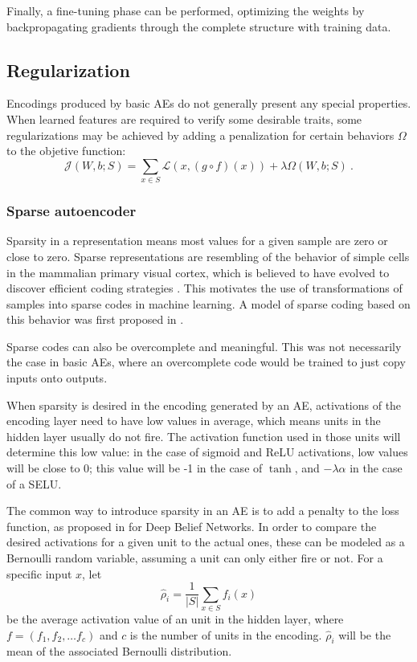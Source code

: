 Finally, a fine-tuning phase can be performed, optimizing the weights by backpropagating gradients through the complete structure with training data.



\subsection{Regularization}\label{Sec.Regularization}

Encodings produced by basic AEs do not generally present any special properties. When learned features are required to verify some desirable traits, some regularizations may be achieved by adding a penalization for certain behaviors $\Omega$ to the objetive function: 
\begin{equation}
  \mathcal J(W,b;S)=\sum_{x\in S} \mathcal L(x, (g\circ f)(x)) + \lambda\Omega(W,b;S)~.
\end{equation}

\subsubsection{Sparse autoencoder}\label{Sec.SparseAE}

Sparsity in a representation means most values for a given sample are zero or close to zero. Sparse representations are resembling of the behavior of simple cells in the mammalian primary visual cortex, which is believed to have evolved to discover efficient coding strategies \cite{olshausen1997sparse}. This motivates the use of transformations of samples into sparse codes in machine learning. A model of sparse coding based on this behavior was first proposed in \cite{olshausen1996emergence}.

Sparse codes can also be overcomplete and meaningful. This was not necessarily the case in basic AEs, where an overcomplete code would be trained to just copy inputs onto outputs.

When sparsity is desired in the encoding generated by an AE, activations of the encoding layer need to have low values in average, which means units in the hidden layer usually do not fire. The activation function used in those units will determine this low value: in the case of sigmoid and ReLU activations, low values will be close to 0; this value will be -1 in the case of $\tanh$, and $-\lambda\alpha$ in the case of a SELU. 

The common way to introduce sparsity in an AE is to add a penalty to the loss function, as proposed in \cite{lee_sparse_2008} for Deep Belief Networks. In order to compare the desired activations for a given unit to the actual ones, these can be modeled as a Bernoulli random variable, assuming a unit can only either fire or not. For a specific input $x$, let
\begin{equation}
  \hat\rho_i=\frac{1}{\left\lvert S\right\rvert} \sum_{x\in S} f_i(x)
\end{equation}
be the average activation value of an unit in the hidden layer, where $f=(f_1,f_2,\dots f_c)$ and $c$ is the number of units in the encoding. $\hat\rho_i$ will be the mean of the associated Bernoulli distribution.

